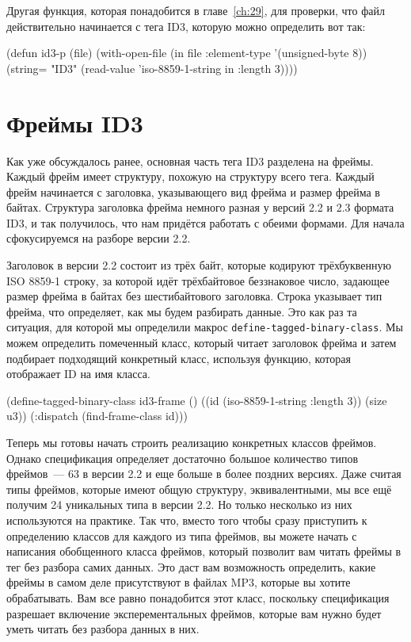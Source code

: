 Другая функция, которая понадобится в главе~\ref{ch:29}, для проверки, что файл
действительно начинается с тега ID3, которую можно определить вот так:

\begin{myverb}
(defun id3-p (file)
  (with-open-file (in file :element-type '(unsigned-byte 8))
    (string= "ID3" (read-value 'iso-8859-1-string in :length 3))))
\end{myverb}

\section{Фреймы ID3}

Как уже обсуждалось ранее, основная часть тега ID3 разделена на фреймы.  Каждый фрейм
имеет структуру, похожую на структуру всего тега.  Каждый фрейм начинается с заголовка,
указывающего вид фрейма и размер фрейма в байтах.  Структура заголовка фрейма немного
разная у версий 2.2 и 2.3 формата ID3, и так получилось, что нам придётся работать с
обеими формами. Для начала сфокусируемся на разборе версии 2.2.

Заголовок в версии 2.2 состоит из трёх байт, которые кодируют трёхбуквенную ISO 8859-1
строку, за которой идёт трёхбайтовое беззнаковое число, задающее размер
фрейма в байтах без шестибайтового заголовка.  Строка указывает тип фрейма, что
определяет, как мы будем разбирать данные.  Это как раз та ситуация, для которой мы
определили макрос \lstinline{define-tagged-binary-class}.  Мы можем определить помеченный класс,
который читает заголовок фрейма и затем подбирает подходящий конкретный класс, используя
функцию, которая отображает ID на имя класса.

\begin{myverb}
(define-tagged-binary-class id3-frame ()
  ((id (iso-8859-1-string :length 3))
   (size u3))
  (:dispatch (find-frame-class id)))
\end{myverb}

Теперь мы готовы начать строить реализацию конкретных классов фреймов.  Однако
спецификация определяет достаточно большое количество типов фреймов~--- 63 в версии 2.2 и
еще больше в более поздних версиях.  Даже считая типы фреймов, которые имеют общую
структуру, эквивалентными, мы все ещё получим 24 уникальных типа в версии 2.2.  Но только
несколько из них используются на практике.  Так что, вместо того чтобы сразу приступить к
определению классов для каждого из типа фреймов, вы можете начать с написания обобщенного
класса фреймов, который позволит вам читать фреймы в тег без разбора самих данных.  Это
даст вам возможность определить, какие фреймы в самом деле присутствуют в файлах MP3,
которые вы хотите обрабатывать.  Вам все равно понадобится этот класс, поскольку
спецификация разрешает включение эксперементальных фреймов, которые вам нужно будет уметь
читать без разбора данных в них.

